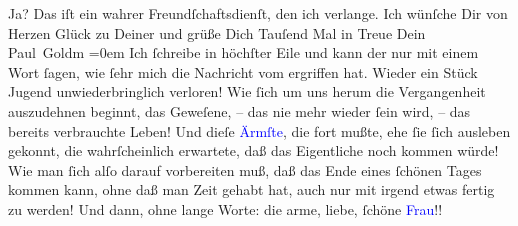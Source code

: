                Ja? Das iſt ein wahrer Freundſchaftsdienſt, den ich verlange.\pend
           \pstart
           Ich wünſche Dir von Herzen Glück zu Deiner \label{K_L02831-7v}\label{K_L02831-7h} und grüße Dich Tauſend Mal in Treue\pend
           \pstart
           Dein {\\[\baselineskip]}\spacefill\mbox{Paul Goldm}\pend
           \leftskip=0em{}\pstart
           \noindent{}Ich ſchreibe in höchſter Eile und kann der nur mit einem {\pb}Wort ſagen, wie ſehr mich die Nachricht vom
                     \label{K_L02831-11v}\label{K_L02831-11h} ergriffen hat. Wieder ein Stück Jugend unwiederbringlich verloren!
                  Wie ſich um uns  herum die Vergangenheit
                  auszudehnen beginnt, das Geweſene, – das nie mehr wieder ſein wird, – das bereits
                  verbrauchte Leben! Und dieſe \textcolor{blue}{Ärmſte}{}, die fort mußte, ehe ſie ſich ausleben gekonnt, die wahrſcheinlich
                  erwartete, daß das Eigentliche noch kommen würde! Wie man ſich alſo darauf
                  vorbereiten muß, daß das Ende eines {\pb}ſchönen
                  Tages kommen kann, ohne daß man Zeit gehabt hat, auch nur mit irgend etwas fertig
                  zu werden! Und dann, ohne lange Worte: die arme, liebe, ſchöne \textcolor{blue}{Frau}{}!!\pend
           \endnumbering{}\begin{anhang}\end{anhang}
      